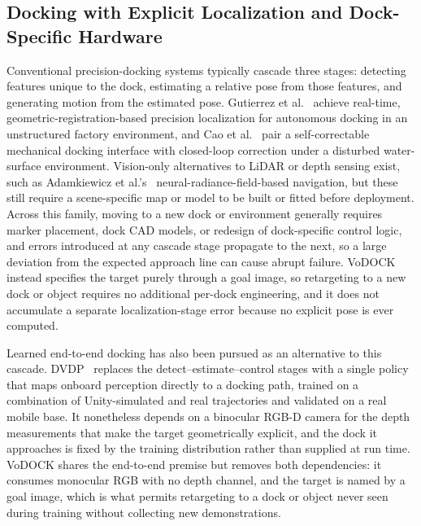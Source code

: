 \documentclass[letterpaper, 10 pt, conference]{IEEEtran}  %
\begin{document}
\subsection{Docking with Explicit Localization and Dock-Specific Hardware}
Conventional precision-docking systems typically cascade three stages: detecting features unique to the dock, estimating a relative pose from those features, and generating motion from the estimated pose. Gutierrez et al.~\cite{gutierrez2025docking} achieve real-time, geometric-registration-based precision localization for autonomous docking in an unstructured factory environment, and Cao et al.~\cite{cao2024dockmech} pair a self-correctable mechanical docking interface with closed-loop correction under a disturbed water-surface environment. Vision-only alternatives to LiDAR or depth sensing exist, such as Adamkiewicz et al.'s~\cite{adamkiewicz2022nerfnav} neural-radiance-field-based navigation, but these still require a scene-specific map or model to be built or fitted before deployment. Across this family, moving to a new dock or environment generally requires marker placement, dock CAD models, or redesign of dock-specific control logic, and errors introduced at any cascade stage propagate to the next, so a large deviation from the expected approach line can cause abrupt failure. VoDOCK instead specifies the target purely through a goal image, so retargeting to a new dock or object requires no additional per-dock engineering, and it does not accumulate a separate localization-stage error because no explicit pose is ever computed.

Learned end-to-end docking has also been pursued as an alternative to this cascade. DVDP~\cite{min2025dvdp} replaces the detect--estimate--control stages with a single policy that maps onboard perception directly to a docking path, trained on a combination of Unity-simulated and real trajectories and validated on a real mobile base. It nonetheless depends on a binocular RGB-D camera for the depth measurements that make the target geometrically explicit, and the dock it approaches is fixed by the training distribution rather than supplied at run time. VoDOCK shares the end-to-end premise but removes both dependencies: it consumes monocular RGB with no depth channel, and the target is named by a goal image, which is what permits retargeting to a dock or object never seen during training without collecting new demonstrations.
\end{document}
